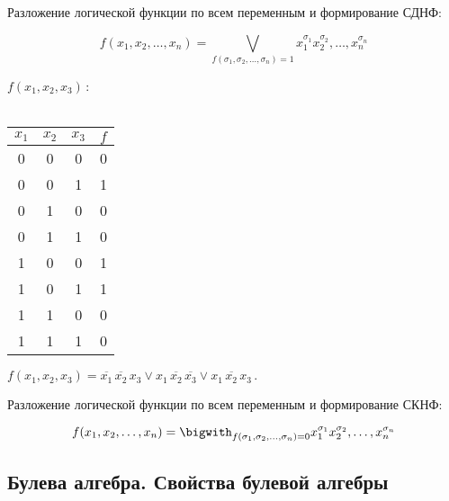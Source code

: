 \begin{conseq}[СДНФ] Разложение логической функции по всем переменным
и формирование СДНФ:

  \begin{equation} f(x_1,x_2,\ldots,x_n)=
\bigvee_{f(\sigma_1,\sigma_2,\ldots,\sigma_n)=1}
x_1^{\sigma_1}x_2^{\sigma_2},\ldots,x_n^{\sigma_n}
  \end{equation}
\end{conseq}

\begin{ex} $f(x_1, x_2, x_3)$\,:\\ \\
  \begin{tabular}{c|c|c||c} $x_1$ & $x_2$ & $x_3$ & $f$\\ \hline
\hline 0 & 0 & 0 & 0\\ \hline 0 & 0 & 1 & 1\\ \hline 0 & 1 & 0 & 0\\
\hline 0 & 1 & 1 & 0\\ \hline 1 & 0 & 0 & 1\\ \hline 1 & 0 & 1 & 1\\
\hline 1 & 1 & 0 & 0\\ \hline 1 & 1 & 1 & 0\\
  \end{tabular} \qquad $ f(x_1, x_2, x_3) =
\overline{x_1}\,\overline{x_2}\,x_3 \lor
x_1\,\overline{x_2}\,\overline{x_3} \lor x_1\,\overline{x_2}\,x_3\,. $
\end{ex}

\begin{conseq}[СКНФ] Разложение логической функции по всем переменным
и формирование СКНФ:

  \begin{equation} f(x_1,x_2,\ldots,x_n)=
\bigwith_{f(\sigma_1,\sigma_2,\ldots,\sigma_n)=0}
x_1^{\sigma_1}x_2^{\sigma_2},\ldots,x_n^{\sigma_n}
  \end{equation}
\end{conseq}


\subsection{Булева алгебра. Свойства булевой алгебры}

